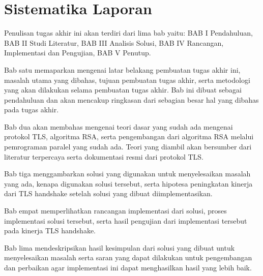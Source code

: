 \section{Sistematika Laporan}

Penulisan tugas akhir ini akan terdiri dari lima bab yaitu: BAB I Pendahuluan, BAB II Studi Literatur, BAB III Analisis Solusi, BAB IV Rancangan, Implementasi dan Pengujian, BAB V Penutup.

Bab satu memaparkan mengenai latar belakang pembuatan tugas akhir ini, masalah utama yang dibahas, tujuan pembuatan tugas akhir, serta metodologi yang akan dilakukan selama pembuatan tugas akhir. Bab ini dibuat sebagai pendahuluan dan akan mencakup ringkasan dari sebagian besar hal yang dibahas pada tugas akhir.

Bab dua akan membahas mengenai teori dasar yang sudah ada mengenai protokol TLS, algoritma RSA, serta pengembangan dari algoritma RSA melalui pemrograman paralel yang sudah ada. Teori yang diambil akan bersumber dari literatur terpercaya serta dokumentasi resmi dari protokol TLS.

Bab tiga menggambarkan solusi yang digunakan untuk menyelesaikan masalah yang ada, kenapa digunakan solusi tersebut, serta hipotesa peningkatan kinerja dari TLS handshake setelah solusi yang dibuat diimplementasikan.

Bab empat memperlihatkan rancangan implementasi dari solusi, proses implementasi solusi tersebut, serta hasil pengujian dari implementasi tersebut pada kinerja TLS handshake.

Bab lima mendeskripsikan hasil kesimpulan dari solusi yang dibuat untuk menyelesaikan masalah serta saran yang dapat dilakukan untuk pengembangan dan perbaikan agar implementasi ini dapat menghasilkan hasil yang lebih baik.
